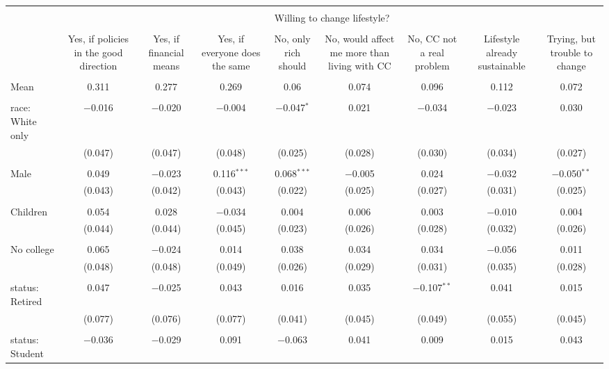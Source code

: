 
\begin{tabular}{@{\extracolsep{5pt}}lcccccccc} 
\\[-1.8ex]\hline 
\hline \\[-1.8ex] 
 & \multicolumn{8}{c}{Willing to change lifestyle?} \\ 
\cline{2-9} 
\\[-1.8ex] & Yes, if policies in the good direction & Yes, if financial means & Yes, if everyone does the same & No, only rich should & No, would affect me more than living with CC & No, CC not a real problem & Lifestyle already sustainable & Trying, but trouble to change \\ 
\hline \\[-1.8ex] 
 Mean & 0.311 & 0.277 & 0.269 & 0.06 & 0.074 & 0.096 & 0.112 & 0.072  \\ \hline \\[-1.8ex] race: White only & $-$0.016 & $-$0.020 & $-$0.004 & $-$0.047$^{*}$ & 0.021 & $-$0.034 & $-$0.023 & 0.030 \\ 
  & (0.047) & (0.047) & (0.048) & (0.025) & (0.028) & (0.030) & (0.034) & (0.027) \\ 
  & & & & & & & & \\ 
 Male & 0.049 & $-$0.023 & 0.116$^{***}$ & 0.068$^{***}$ & $-$0.005 & 0.024 & $-$0.032 & $-$0.050$^{**}$ \\ 
  & (0.043) & (0.042) & (0.043) & (0.022) & (0.025) & (0.027) & (0.031) & (0.025) \\ 
  & & & & & & & & \\ 
 Children & 0.054 & 0.028 & $-$0.034 & 0.004 & 0.006 & 0.003 & $-$0.010 & 0.004 \\ 
  & (0.044) & (0.044) & (0.045) & (0.023) & (0.026) & (0.028) & (0.032) & (0.026) \\ 
  & & & & & & & & \\ 
 No college & 0.065 & $-$0.024 & 0.014 & 0.038 & 0.034 & 0.034 & $-$0.056 & 0.011 \\ 
  & (0.048) & (0.048) & (0.049) & (0.026) & (0.029) & (0.031) & (0.035) & (0.028) \\ 
  & & & & & & & & \\ 
 status: Retired & 0.047 & $-$0.025 & 0.043 & 0.016 & 0.035 & $-$0.107$^{**}$ & 0.041 & 0.015 \\ 
  & (0.077) & (0.076) & (0.077) & (0.041) & (0.045) & (0.049) & (0.055) & (0.045) \\ 
  & & & & & & & & \\ 
 status: Student & $-$0.036 & $-$0.029 & 0.091 & $-$0.063 & 0.041 & 0.009 & 0.015 & 0.043 \\ 

\end{tabular}
